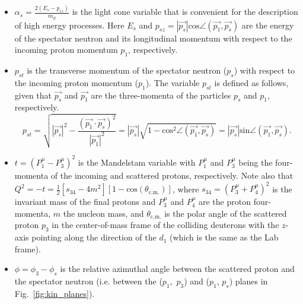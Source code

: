 \begin{itemize}

\item  \mbox{\large$\alpha_{s}=\frac{2(E_{s}-p_{sz})}{m_{d}}$} is the light cone variable that is convenient for the description of high energy processes. Here $E_{s}$ and $p_{sz}=\left| \overrightarrow{p_{s}}\right|\textrm{cos}\angle \left(\overrightarrow{p_{1}}, \overrightarrow{p_{s}} \right)$ are the energy of the spectator neutron and its longitudinal momentum with respect to the incoming proton momentum $p_{1}$, respectively. 

\item $p_{st}$ is the transverse momentum of the spectator neutron ($p_{s}$) with respect to the incoming proton momentum ($p_{1}$). The variable $p_{st}$ is defined as follows, given that $\overrightarrow{p_{s}}$ and $\overrightarrow{p_{1}}$ are the three-momenta of the particles $p_{s}$ and $p_{1}$, respectively.
\begin{equation}
p_{st} = \sqrt {\left| \overrightarrow{p_{s}} \right|^{2} -  \frac{\left( \overrightarrow{p_{1}}\cdot \overrightarrow{p_{s}}\right)^{2}}{\left| \overrightarrow{p_{1}} \right|^{2}}} = \left| \overrightarrow{p_{s}} \right| \sqrt{1-\textrm{cos}^{2}\angle \left(\overrightarrow{p_{1}}, \overrightarrow{p_{s}} \right)} = \left| \overrightarrow{p_{s}}\right|\textrm{sin}\angle \left(\overrightarrow{p_{1}}, \overrightarrow{p_{s}} \right) .\label{eq:cyy}
\end{equation}

\item $t=\left(P^{\mu}_{1}-P^{\mu}_{3}\right)^{2}$ is the Mandelstam variable with $P^{\mu}_{1}$ and $P^{\mu}_{3}$ being the four-momenta of the incoming and scattered protons, respectively.  Note also that $Q^{2} = -t = \frac{1}{2}\left [s_{34}-4m^{2}\right ]\left [1-\textrm{cos}(\theta_{\textrm{c.m.}})\right ]$, where $s_{34} = \left(P^{\mu}_{3}+P^{\mu}_{4}\right)^{2}$ is the invariant mass of the final protons and $P^{\mu}_{3}$ and $P^{\mu}_{4}$ are the proton four-momenta, $m$ the nucleon mass, and $\theta_{\textrm{c.m.}}$ is the polar angle of the scattered proton $p_{3}$ in the center-of-mass frame of the colliding deuterons with the $z$-axis pointing along the direction of the $d_{1}$ (which is the same as the Lab frame).

\item $\phi = \phi_{3}-\phi_{s}$ is the relative azimuthal angle between the scattered proton and the spectator neutron (i.e. between the ($p_{1}$,~$p_{3}$) and ($p_{1}$, $p_{s}$) planes in Fig.~\ref{fig:kin_planes}).

\end{itemize}



